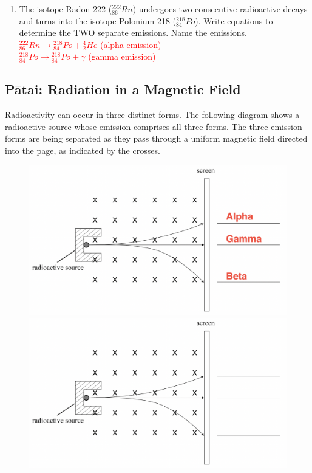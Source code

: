 \documentclass[12pt]{report}
\makeatletter
\DeclareRobustCommand{\StudentVSpace}[2]{%
	\ifthenelse{\boolean{@answer}}
	{\textcolor{red}{\\#1}}
	{\vspace{#2}}
}
\makeatother
\begin{document}
\begin{enumerate}[itemsep=1cm]
	\item The isotope Radon-222 (${}^{222}_{86}Rn$) undergoes two consecutive radioactive decays and turns into the isotope Polonium-218 (${}^{218}_{84}Po$). Write equations to determine the TWO separate emissions. Name the emissions.
	      \StudentVSpace{
	      ${}^{222}_{86}Rn \rightarrow {}^{218}_{84}Po + {}^{4}_{2}He$ (alpha emission) \\
	      ${}^{218}_{84}Po \rightarrow {}^{218}_{84}Po + \gamma$ (gamma emission)
	      }{1cm}
\end{enumerate}

\subsection{Pātai: Radiation in a Magnetic Field}
Radioactivity can occur in three distinct forms. The following diagram shows a radioactive source whose emission comprises all three forms. The three emission forms are being separated as they pass through a uniform magnetic field directed into the page, as indicated by the crosses.

\begin{figure}[ht]
	\centering
	{\includegraphics[width=0.8\linewidth]{radiation-magnetic-field-2-answer.png}}
	{\includegraphics[width=0.8\linewidth]{radiation-magnetic-field-2.png}}
\end{figure}
\end{document}
